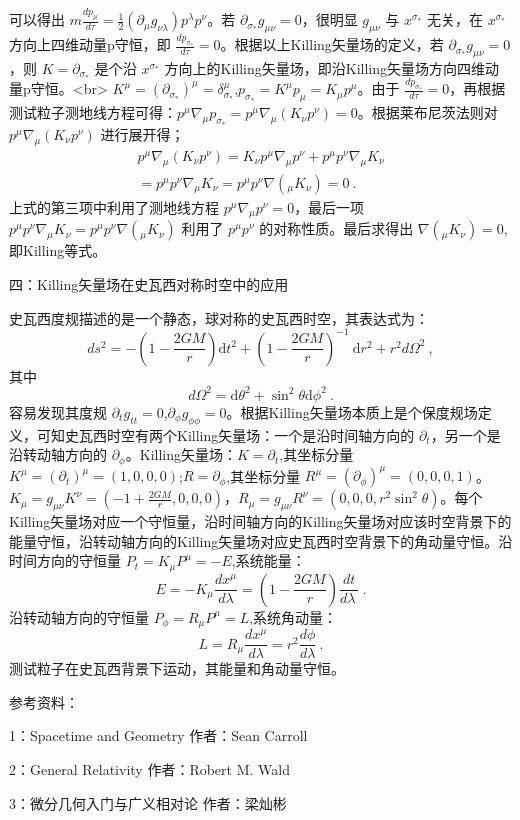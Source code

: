 可以得出 $m\frac{d p_{\mu}}{d \tau}=\frac{1}{2}\left(\partial_{\mu} g_{\nu \lambda}\right) p^{\lambda} p^{\nu}$。若 $\partial_{\sigma_{*}} g_{\mu \nu}=0$，很明显 $g_{\mu \nu}$ 与 $x^{\sigma_{*}}$ 无关，在 $x^{\sigma_{*}}$ 方向上四维动量p守恒，即 $\frac{d p_{\sigma_{*}}}{d \tau}=0$。根据以上Killing矢量场的定义，若 $\partial_{\sigma_{*}} g_{\mu \nu}=0$，则 $K=\partial_{\sigma_{*}}$ 是个沿 $x^{\sigma_{*}}$ 方向上的Killing矢量场，即沿Killing矢量场方向四维动量p守恒。<br>
$K^{\mu}=(\partial_{\sigma_{*}})^{\mu}=\delta_{\sigma_{*}}^{\mu}$,$p_{\sigma_{*}}=K^{\mu}p_{\mu}=K_{\mu}p^{\mu}$。由于 $\frac{d p_{\sigma_{*}}}{d \tau}=0$，再根据测试粒子测地线方程可得：$p^{\mu} \nabla_{\mu} p_{\sigma_{*}}=p^{\mu} \nabla_{\mu}(K_{\nu}p^{\nu}) =0$。根据莱布尼茨法则对 $p^{\mu} \nabla_{\mu}(K_{\nu}p^{\nu})$ 进行展开得；
$$\begin{aligned}
p^{\mu} \nabla_{\mu}(K_{\nu}p^{\nu})=K_{\nu}p^{\mu} \nabla_{\mu}p^{\nu}+p^{\mu} p^{\nu}\nabla_{\mu}K_{\nu}\\
=p^{\mu} p^{\nu}\nabla_{\mu}K_{\nu}=p^{\mu} p^{\nu}\nabla(_{\mu}K_{\nu})=0~.
\end{aligned}$$
上式的第三项中利用了测地线方程 $p^{\mu} \nabla_{\mu}p^{\nu}=0$，最后一项 $p^{\mu} p^{\nu}\nabla_{\mu}K_{\nu}=p^{\mu} p^{\nu}\nabla(_{\mu}K_{\nu})$ 利用了 $p^{\mu} p^{\nu}$ 的对称性质。最后求得出 $\nabla(_{\mu}K_{\nu})=0$,即Killing等式。

四：Killing矢量场在史瓦西对称时空中的应用

史瓦西度规描述的是一个静态，球对称的史瓦西时空，其表达式为：
$$d s^{2}=-\left(1-\frac{2 G M}{r}\right) \mathrm{d} t^{2}+\left(1-\frac{2 G M}{r}\right)^{-1} \mathrm{~d} r^{2}+r^{2} d \Omega^{2}~,$$其中$$d \Omega^{2}=\mathrm{d} \theta^{2}+\sin ^{2} \theta \mathrm{d} \phi^{2}~.$$
容易发现其度规 $\partial_{t} g_{tt}=0$,$\partial_{\phi} g_{\phi\phi}=0$。根据Killing矢量场本质上是个保度规场定义，可知史瓦西时空有两个Killing矢量场：一个是沿时间轴方向的 $\partial_{t}$，另一个是沿转动轴方向的 $\partial_{\phi}$。Killing矢量场：$K=\partial_{t}$,其坐标分量 $K^{\mu}=\left(\partial_{t}\right)^{\mu}=(1,0,0,0)$;$R=\partial_{\phi}$,其坐标分量 $R^{\mu}=\left(\partial_{\phi}\right)^{\mu}=(0,0,0,1)$。$K_{\mu}=g_{\mu \nu}K^{\nu}=(-1+\frac{2 G M}{r},0,0,0)$，$R_{\mu}=g_{\mu \nu}R^{\nu}=(0,0,0,r^{2}\sin ^{2} \theta )$。每个Killing矢量场对应一个守恒量，沿时间轴方向的Killing矢量场对应该时空背景下的能量守恒，沿转动轴方向的Killing矢量场对应史瓦西时空背景下的角动量守恒。沿时间方向的守恒量 $P_{t}=K_{\mu}P^{\mu}=-E$,系统能量：$$E=-K_{\mu} \frac{d x^{\mu}}{d \lambda}=\left(1-\frac{2 G M}{r}\right) \frac{d t}{d \lambda~}~.$$
沿转动轴方向的守恒量 $P_{\phi}=R_{\mu}P^{\mu}=L$,系统角动量：$$L=R_{\mu} \frac{d x^{\mu}}{d \lambda}=r^{2} \frac{d \phi}{d \lambda}~.$$
测试粒子在史瓦西背景下运动，其能量和角动量守恒。

参考资料：

1：Spacetime and Geometry 作者：Sean Carroll

2：General Relativity   作者：Robert M. Wald

3：微分几何入门与广义相对论  作者：梁灿彬

